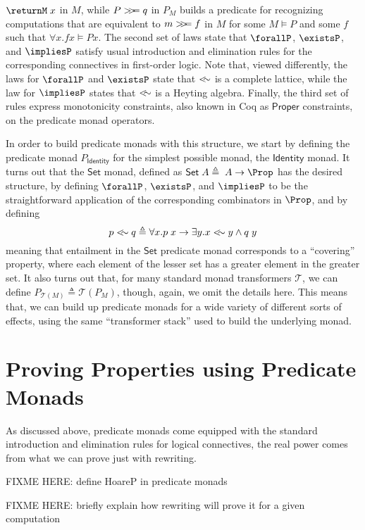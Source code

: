 \documentclass[preprint]{sigplanconf}
\begin{document}
$\returnM\;x$ in $M$, while $P>\!\!>\!\!= q$ in $P_M$ builds a predicate for
recognizing computations that are equivalent to $m>\!\!>\!\!= f$ in $M$ for some
$M\vDash P$ and some $f$ such that $\forall x.f x \vDash P x$.
%
The second set of laws state that $\forallP$, $\existsP$, and $\impliesP$
satisfy usual introduction and elimination rules for the corresponding
connectives in first-order logic. Note that, viewed differently, the laws for
$\forallP$ and $\existsP$ state that $<\!\!\sim$ is a complete lattice, while the
law for $\impliesP$ states that $<\!\!\sim$ is a Heyting algebra.
%
Finally, the third set of rules express monotonicity constraints, also known in
Coq as $\mathsf{Proper}$ constraints, on the predicate monad operators.

In order to build predicate monads with this structure, we start by defining the
predicate monad $P_{\mathsf{Identity}}$ for the simplest possible monad, the
$\mathsf{Identity}$ monad. It turns out that the $\mathsf{Set}$ monad, defined as
$\mathsf{Set}\;A\triangleq\;A\to\Prop$ has the desired structure, by defining
$\forallP$, $\existsP$, and $\impliesP$ to be the straightforward application of
the corresponding combinators in $\Prop$, and by defining
\[
p <\!\!\sim q \triangleq \forall x. p\;x \to \exists y. x<\!\!\sim y \wedge q\;y
\]
meaning that entailment in the $\mathsf{Set}$ predicate monad corresponds to
a ``covering'' property, where each element of the lesser set has a greater
element in the greater set.
%
It also turns out that, for many standard monad transformers $\mathcal{T}$, we
can define $P_{\mathcal{T}(M)}\triangleq\mathcal{T}(P_M)$, though, again, we
omit the details here. This means that, we can build up predicate monads for a
wide variety of different sorts of effects, using the same ``transformer stack''
used to build the underlying monad.


\section{Proving Properties using Predicate Monads}

As discussed above, predicate monads come equipped with the standard
introduction and elimination rules for logical connectives, the real power
comes from what we can prove just with rewriting.


FIXME HERE: define HoareP in predicate monads

FIXME HERE: briefly explain how rewriting will prove it for a given computation





\end{document}
